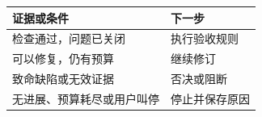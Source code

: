 \begin{tabular}{@{}P{4.0cm}P{8.5cm}@{}}
\toprule
\textbf{证据或条件} & \textbf{下一步} \\
\midrule
检查通过，问题已关闭 & 执行验收规则 \\
可以修复，仍有预算 & 继续修订 \\
致命缺陷或无效证据 & 否决或阻断 \\
无进展、预算耗尽或用户叫停 & 停止并保存原因 \\
\bottomrule
\end{tabular}
